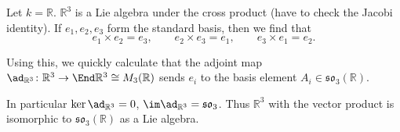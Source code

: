Let $k = \mathbb{R}$. $\mathbb{R}^3$ is a Lie algebra under the cross product
(have to check the Jacobi identity). If $e_1, e_2, e_3$ form the standard basis,
then we find that
\[ e_1 \times e_2 = e_3,\qquad e_2\times e_3 = e_1,\qquad e_3\times e_1=e_2. \]

Using this, we quickly calculate that the adjoint map
$\ad_{\mathbb{R}^3}\colon \mathbb{R}^3\to \End \mathbb{R}^3 \cong M_3(\mathbb{R})$ sends $e_i$ to
the basis element $A_i\in \mathfrak{so}_3(\mathbb{R})$.

In particular $\ker\ad_{\mathbb{R}^3} = 0$, $\im\ad_{\mathbb{R}^3} = \mathfrak{so}_3$.
Thus $\mathbb{R}^3$ with the vector product is isomorphic to $\mathfrak{so}_3(\mathbb{R})$ as
a Lie algebra.
